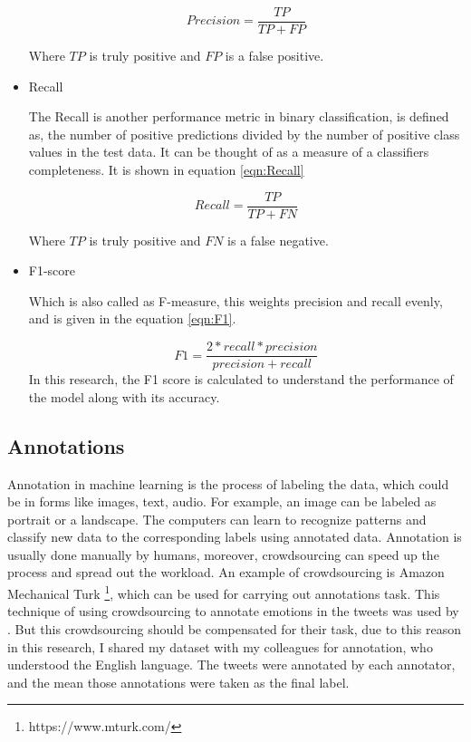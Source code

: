\begin{itemize}
    \begin{equation}
    \label{eqn:Precision}
    Precision = \frac{TP}{TP + FP}
    \end{equation}
    
    Where $TP$ is truly positive and $FP$ is a false positive.
    
    \item Recall
    
    The Recall is another performance metric in binary classification, is defined as, the number of positive predictions divided by the number of positive class values in the test data. It can be thought of as a measure of a classifiers completeness. It is shown in equation \ref{eqn:Recall} 
    
    \begin{equation}
        \label{eqn:Recall}
    Recall = \frac{TP}{TP + FN}
    \end{equation}
    
     Where $TP$ is truly positive and $FN$ is a false negative.
    
    \item F1-score
   
    Which is also called as F-measure, this weights precision and recall evenly, and is given in the equation \ref{eqn:F1}.
    
        \begin{equation}
        \label{eqn:F1}
    F1 = \frac{2 * recall * precision}{precision + recall}
    \end{equation}
    In this research, the F1 score is calculated to understand the performance of the model along with its accuracy.
\end{itemize}

\subsection{Annotations}

Annotation in machine learning is the process of labeling the data, which could be in forms like images, text, audio. For example, an image can be labeled as portrait or a landscape. The computers can learn to recognize patterns and classify new data to the corresponding labels using annotated data. Annotation is usually done manually by humans, moreover, crowdsourcing can speed up the process and spread out the workload. An example of crowdsourcing is Amazon Mechanical Turk \footnote{https://www.mturk.com/}, which can be used for carrying out annotations task. This technique of using crowdsourcing to annotate emotions in the tweets was used by \cite{Mohammad:2010:EEC:1860631.1860635}. But this crowdsourcing should be compensated for their task, due to this reason in this research, I shared my dataset with my colleagues for annotation, who understood the English language. The tweets were annotated by each annotator, and the mean those annotations were taken as the final label.  

